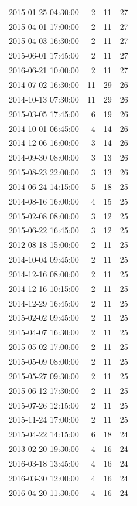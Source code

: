 \begin{tabular}{lrrr}
2015-01-25 04:30:00 & 2 & 11 & 27 \\
2015-04-01 17:00:00 & 2 & 11 & 27 \\
2015-04-03 16:30:00 & 2 & 11 & 27 \\
2015-06-01 17:45:00 & 2 & 11 & 27 \\
2016-06-21 10:00:00 & 2 & 11 & 27 \\
2014-07-02 16:30:00 & 11 & 29 & 26 \\
2014-10-13 07:30:00 & 11 & 29 & 26 \\
2015-03-05 17:45:00 & 6 & 19 & 26 \\
2014-10-01 06:45:00 & 4 & 14 & 26 \\
2014-12-06 16:00:00 & 3 & 14 & 26 \\
2014-09-30 08:00:00 & 3 & 13 & 26 \\
2015-08-23 22:00:00 & 3 & 13 & 26 \\
2014-06-24 14:15:00 & 5 & 18 & 25 \\
2014-08-16 16:00:00 & 4 & 15 & 25 \\
2015-02-08 08:00:00 & 3 & 12 & 25 \\
2015-06-22 16:45:00 & 3 & 12 & 25 \\
2012-08-18 15:00:00 & 2 & 11 & 25 \\
2014-10-04 09:45:00 & 2 & 11 & 25 \\
2014-12-16 08:00:00 & 2 & 11 & 25 \\
2014-12-16 10:15:00 & 2 & 11 & 25 \\
2014-12-29 16:45:00 & 2 & 11 & 25 \\
2015-02-02 09:45:00 & 2 & 11 & 25 \\
2015-04-07 16:30:00 & 2 & 11 & 25 \\
2015-05-02 17:00:00 & 2 & 11 & 25 \\
2015-05-09 08:00:00 & 2 & 11 & 25 \\
2015-05-27 09:30:00 & 2 & 11 & 25 \\
2015-06-12 17:30:00 & 2 & 11 & 25 \\
2015-07-26 12:15:00 & 2 & 11 & 25 \\
2015-11-24 17:00:00 & 2 & 11 & 25 \\
2015-04-22 14:15:00 & 6 & 18 & 24 \\
2013-02-20 19:30:00 & 4 & 16 & 24 \\
2016-03-18 13:45:00 & 4 & 16 & 24 \\
2016-03-30 12:00:00 & 4 & 16 & 24 \\
2016-04-20 11:30:00 & 4 & 16 & 24 \\

\end{tabular}
